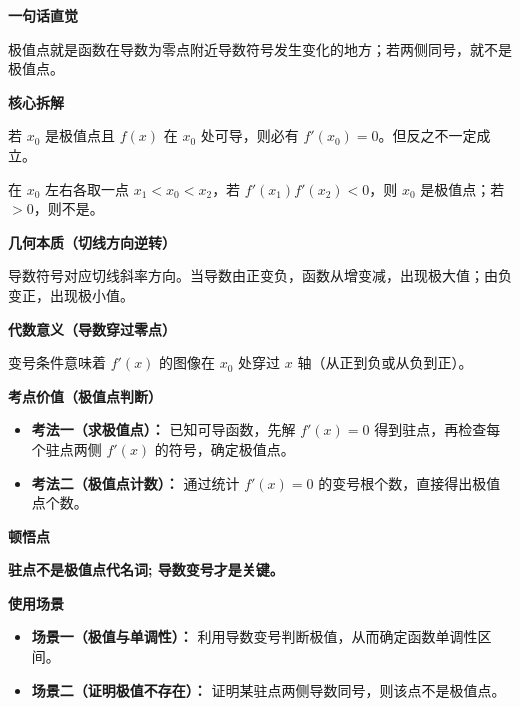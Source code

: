 \begin{explanationbox}
	\textbf{\textcolor{CExplanation}{一句话直觉}}

	极值点就是函数在导数为零点附近导数符号发生变化的地方；若两侧同号，就不是极值点。

	\medskip
	\textbf{\textcolor{CExplanation}{核心拆解}}
	\begin{description}[style=nextline, leftmargin=2.8em, labelsep=0.5em, itemsep=0.45em]
		\item[\textbf{要点一（驻点必要条件）：}] 若 $x_0$ 是极值点且 $f(x)$ 在 $x_0$ 处可导，则必有 $f'(x_0)=0$。但反之不一定成立。
		\item[\textbf{要点二（变号判定）：}] 在 $x_0$ 左右各取一点 $x_1<x_0<x_2$，若 $f'(x_1)f'(x_2)<0$，则 $x_0$ 是极值点；若 $>0$，则不是。
	\end{description}

	\medskip
	\textbf{\textcolor{CExplanation}{几何本质（切线方向逆转）}}

	导数符号对应切线斜率方向。当导数由正变负，函数从增变减，出现极大值；由负变正，出现极小值。

	\medskip
	\textbf{\textcolor{CExplanation}{代数意义（导数穿过零点）}}

	变号条件意味着 $f'(x)$ 的图像在 $x_0$ 处穿过 $x$ 轴（从正到负或从负到正）。

	\medskip
	\textbf{\textcolor{CExplanation}{考点价值（极值点判断）}}
	\begin{itemize}[leftmargin=*, itemsep=0.5em, topsep=0.4em]
		\item \textbf{考法一（求极值点）：} 已知可导函数，先解 $f'(x)=0$ 得到驻点，再检查每个驻点两侧 $f'(x)$ 的符号，确定极值点。
		\item \textbf{考法二（极值点计数）：} 通过统计 $f'(x)=0$ 的变号根个数，直接得出极值点个数。
	\end{itemize}

	\medskip
	\textbf{\textcolor{CExplanation}{顿悟点}}

	\textbf{驻点不是极值点代名词; 导数变号才是关键。}

	\medskip
	\textbf{\textcolor{CExplanation}{使用场景}}
	\begin{itemize}[leftmargin=*, itemsep=0.5em, topsep=0.4em]
		\item \textbf{场景一（极值与单调性）：} 利用导数变号判断极值，从而确定函数单调性区间。
		\item \textbf{场景二（证明极值不存在）：} 证明某驻点两侧导数同号，则该点不是极值点。
	\end{itemize}
\end{explanationbox}
